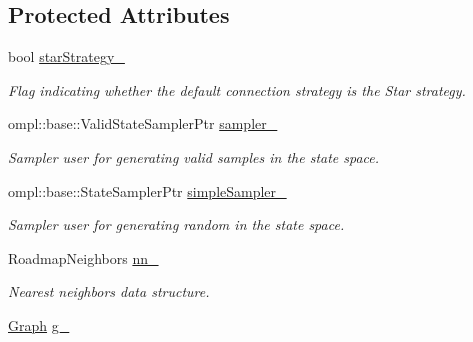 \subsection*{\-Protected \-Attributes}
\begin{DoxyCompactItemize}
\item 
\hypertarget{class_f_i_r_m_a1381ddffa42b0bf2d36dc9c6d9d1da9d}{bool \hyperlink{class_f_i_r_m_a1381ddffa42b0bf2d36dc9c6d9d1da9d}{star\-Strategy\-\_\-}}\label{class_f_i_r_m_a1381ddffa42b0bf2d36dc9c6d9d1da9d}

\begin{DoxyCompactList}\small\item\em \-Flag indicating whether the default connection strategy is the \-Star strategy. \end{DoxyCompactList}\item 
\hypertarget{class_f_i_r_m_af4307c058abb03b3a84c5c60e849c191}{ompl\-::base\-::\-Valid\-State\-Sampler\-Ptr \hyperlink{class_f_i_r_m_af4307c058abb03b3a84c5c60e849c191}{sampler\-\_\-}}\label{class_f_i_r_m_af4307c058abb03b3a84c5c60e849c191}

\begin{DoxyCompactList}\small\item\em \-Sampler user for generating valid samples in the state space. \end{DoxyCompactList}\item 
\hypertarget{class_f_i_r_m_af71a0e86b8a99f9eaa687f161d8d68e1}{ompl\-::base\-::\-State\-Sampler\-Ptr \hyperlink{class_f_i_r_m_af71a0e86b8a99f9eaa687f161d8d68e1}{simple\-Sampler\-\_\-}}\label{class_f_i_r_m_af71a0e86b8a99f9eaa687f161d8d68e1}

\begin{DoxyCompactList}\small\item\em \-Sampler user for generating random in the state space. \end{DoxyCompactList}\item 
\hypertarget{class_f_i_r_m_aeed6858c0216ed9fc49f02e4aafc4443}{\-Roadmap\-Neighbors \hyperlink{class_f_i_r_m_aeed6858c0216ed9fc49f02e4aafc4443}{nn\-\_\-}}\label{class_f_i_r_m_aeed6858c0216ed9fc49f02e4aafc4443}

\begin{DoxyCompactList}\small\item\em \-Nearest neighbors data structure. \end{DoxyCompactList}\item 
\hypertarget{class_f_i_r_m_ac954812b235fc64b57ea319bec7c80bb}{\hyperlink{class_f_i_r_m_a687e9f4243b22c30ee1fa5da22a85053}{\-Graph} \hyperlink{class_f_i_r_m_ac954812b235fc64b57ea319bec7c80bb}{g\-\_\-}}\label{class_f_i_r_m_ac954812b235fc64b57ea319bec7c80bb}


\end{DoxyCompactItemize}
